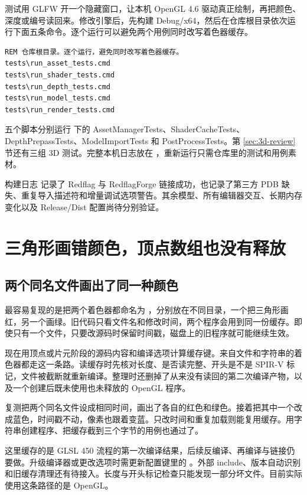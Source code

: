 测试用 GLFW 开一个隐藏窗口，让本机 OpenGL 4.6 驱动真正绘制，再把颜色、深度或编号读回来。修改引擎后，先构建 Debug/x64，然后在仓库根目录依次运行下面五条命令。逐个运行可以避免两个用例同时改写着色器缓存。

\begin{verbatim}
REM 仓库根目录。逐个运行，避免同时改写着色器缓存。
tests\run_asset_tests.cmd
tests\run_shader_tests.cmd
tests\run_depth_tests.cmd
tests\run_model_tests.cmd
tests\run_render_tests.cmd
\end{verbatim}

五个脚本分别运行  下的 AssetManagerTests、ShaderCacheTests、DepthPrepassTests、ModelImportTests 和 PostProcessTests。第 \ref{sec:3d-review} 节还有三组 3D 测试。完整本机日志放在 ，重新运行只需仓库里的测试和用例素材。

构建日志  记录了 Redflag 与 RedflagForge 链接成功，也记录了第三方 PDB 缺失、重复导入描述符和增量调试选项警告。其余模型、所有编辑器交互、长期内存变化以及 Release/Dist 配置尚待分别验证。




\newpage
\section{三角形画错颜色，顶点数组也没有释放}
\subsection{两个同名文件画出了同一种颜色}
最容易复现的是把两个着色器都命名为 ，分别放在不同目录，一个把三角形画红，另一个画绿。旧代码只看文件名和修改时间，两个程序会用到同一份缓存。即使只有一个文件，只要改源码时保留时间戳，磁盘上的旧程序就可能继续生效。

现在用顶点或片元阶段的源码内容和编译选项计算缓存键。来自文件和字符串的着色器都走这一条路。读缓存时先核对长度、是否读完整、开头是不是 SPIR-V 标记，文件被截断就重新编译。整理时还删掉了从来没有读回的第二次编译产物，以及一个创建后既未使用也未释放的 OpenGL 程序。

复测把两个同名文件设成相同时间，画出了各自的红色和绿色。接着把其中一个改成蓝色，时间戳不动，像素也跟着变蓝。只改时间和重复加载则能复用缓存。用字符串创建程序、把缓存截到三个字节的用例也通过了。

这里缓存的是 GLSL 450 流程的第一次编译结果，后续反编译、再编译与链接仍要做。升级编译器或更改选项时需更新配置键里的 。外部 include、版本自动识别和旧缓存清理还有待接入。长度与开头标记检查只能发现一部分坏文件。目前实际使用这条路径的是 OpenGL。

